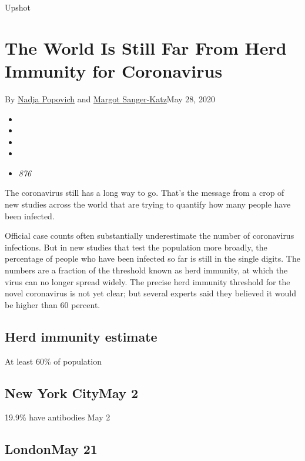 Upshot

\hypertarget{the-world-is-still-far-from-herd-immunity-for-coronavirus}{%
\section{The World Is Still Far From Herd Immunity for
Coronavirus}\label{the-world-is-still-far-from-herd-immunity-for-coronavirus}}

By \href{https://www.nytimes3xbfgragh.onion/by/nadja-popovich}{Nadja
Popovich} and
\href{https://www.nytimes3xbfgragh.onion/by/margot-sanger-katz}{Margot
Sanger-Katz}May 28, 2020

\begin{itemize}
\item
\item
\item
\item
\item
  \emph{876}
\end{itemize}

The coronavirus still has a long way to go. That's the message from a
crop of new studies across the world that are trying to quantify how
many people have been infected.

Official case counts often substantially underestimate the number of
coronavirus infections. But in new studies that test the population more
broadly, the percentage of people who have been infected so far is still
in the single digits. The numbers are a fraction of the threshold known
as herd immunity, at which the virus can no longer spread widely. The
precise herd immunity threshold for the novel coronavirus is not yet
clear; but several experts said they believed it would be higher than 60
percent.

\hypertarget{herd-immunity-estimate}{%
\subsection{Herd immunity estimate}\label{herd-immunity-estimate}}

At least 60\% of population

\hypertarget{new-york-citymay-2}{%
\subsection{New York CityMay 2}\label{new-york-citymay-2}}

19.9\% have antibodies May 2

\hypertarget{londonmay-21}{%
\subsection{LondonMay 21}\label{londonmay-21}}

